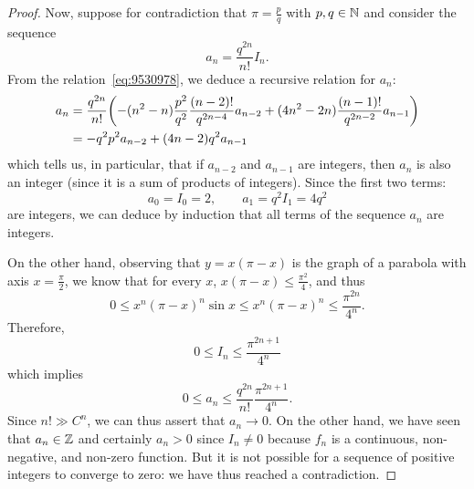 \begin{proof}
Now, suppose for contradiction that $\pi = \frac p q$ with $p,q\in {\mathbb N}$ and
consider the sequence
\[
   a_n = \frac{q^{2n}}{n!} I_n.
\]
From the relation~\eqref{eq:9530978}, we deduce a recursive relation for $a_n$:
\begin{align*}
    a_n &= \frac{q^{2n}}{n!}{\left( -(n^2-n)\frac{p^2}{q^2}
  \frac{(n-2)!}{q^{2n-4}}a_{n-2}
  + (4n^2-2n) \frac{(n-1)!}{q^{2n-2}}a_{n-1} \right)} \\
  &= - q^2 p^2 a_{n-2} + (4n-2)q^2 a_{n-1}
\end{align*}
which tells us, in particular, that if $a_{n-2}$ and $a_{n-1}$ are integers,
then $a_n$ is also an integer (since it is a sum of products of integers).
Since the first two terms:
\[
  a_0 = I_0 = 2, \qquad
  a_1 = q^2 I_1 = 4 q^2
\]
are integers, we can deduce by induction that all terms of the sequence $a_n$
are integers.

On the other hand, observing that $y=x(\pi-x)$ is the graph of a parabola with
axis $x=\frac \pi 2$, we know that for every $x$, $x(\pi-x) \le
\frac{\pi^2}{4}$, and thus
\[
  0 \le x^n(\pi-x)^n \sin x
    \le x^n (\pi-x)^n \le \frac{\pi^{2n}}{4^n}.
\]
Therefore,
\[
  0 \le I_n \le \frac{\pi^{2n+1}}{4^n}
\]
which implies
\[
  0 \le a_n \le \frac{q^{2n}}{n!}\frac{\pi^{2n+1}}{4^n}.
\]
Since $n! \gg C^n$, we can thus assert that $a_n\to 0$.
On the other hand, we have seen that $a_n \in {\mathbb Z}$ and certainly $a_n > 0$ since
$I_n \neq 0$ because $f_n$ is a continuous, non-negative, and non-zero function.
But it is not possible for a sequence of positive integers to converge to zero:
we have thus reached a contradiction.
\end{proof}

